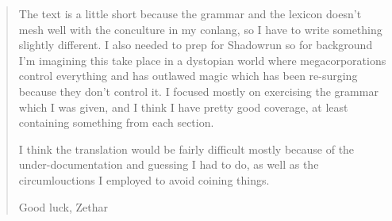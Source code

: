 \documentclass{thiguka}
\begin{document}
\begin{quote}

The text is a little short because the grammar and the lexicon doesn’t mesh well with the conculture in my conlang, so I have to write something slightly different.
I also needed to prep for Shadowrun so for background I’m imagining this take place in a dystopian world where megacorporations control everything and has outlawed magic which has been re-surging because they don’t control it.
I focused mostly on exercising the grammar which I was given, and I think I have pretty good coverage, at least containing something from each section.

I think the translation would be fairly difficult mostly because of the under-documentation and guessing I had to do, as well as the circumlouctions I employed to avoid coining things.

Good luck, Zethar
\end{quote}
\end{document}
